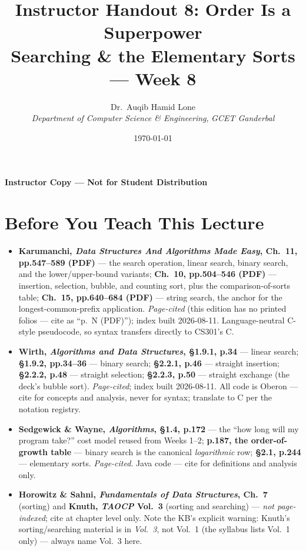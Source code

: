 \documentclass[11pt]{article}
\title{Instructor Handout 8: Order Is a Superpower\\\large Searching \& the Elementary Sorts --- Week 8}
\author{Dr.\ Auqib Hamid Lone\\[0.3em]
  \emph{Department of Computer Science \& Engineering}, \emph{GCET Ganderbal}}
\date{\today}
\begin{document}
\maketitle
{\centering\large\color{negative}\textbf{Instructor Copy --- Not for Student Distribution}\par}
\vspace{0.5cm}

\section{Before You Teach This Lecture}

\begingroup\sloppy
\begin{itemize}
  \item \textbf{Karumanchi, \textit{Data Structures And Algorithms Made Easy}, Ch.~11, pp.547--589 (PDF)} --- the search operation, linear search, binary search, and the lower/upper-bound variants; \textbf{Ch.~10, pp.504--546 (PDF)} --- insertion, selection, bubble, and counting sort, plus the comparison-of-sorts table; \textbf{Ch.~15, pp.640--684 (PDF)} --- string search, the anchor for the longest-common-prefix application. \emph{Page-cited} (this edition has no printed folios --- cite as ``p.~N (PDF)''); index built 2026-08-11. Language-neutral C-style pseudocode, so syntax transfers directly to CS301's C.
  \item \textbf{Wirth, \textit{Algorithms and Data Structures}, \S1.9.1, p.34} --- linear search; \textbf{\S1.9.2, pp.34--36} --- binary search; \textbf{\S2.2.1, p.46} --- straight insertion; \textbf{\S2.2.2, p.48} --- straight selection; \textbf{\S2.2.3, p.50} --- straight exchange (the deck's bubble sort). \emph{Page-cited}; index built 2026-08-11. All code is Oberon --- cite for concepts and analysis, never for syntax; translate to C per the notation registry.
  \item \textbf{Sedgewick \& Wayne, \textit{Algorithms}, \S1.4, p.172} --- the ``how long will my program take?'' cost model reused from Weeks 1--2; \textbf{p.187, the order-of-growth table} --- binary search is the canonical \emph{logarithmic} row; \textbf{\S2.1, p.244} --- elementary sorts. \emph{Page-cited}. Java code --- cite for definitions and analysis only.
  \item \textbf{Horowitz \& Sahni, \textit{Fundamentals of Data Structures}, Ch.~7} (sorting) and \textbf{Knuth, \textit{TAOCP} Vol.~3} (sorting and searching) --- \emph{not page-indexed}; cite at chapter level only. Note the KB's explicit warning: Knuth's sorting/searching material is in \emph{Vol.~3}, not Vol.~1 (the syllabus lists Vol.~1 only) --- always name Vol.~3 here.

\end{itemize}
\end{document}
